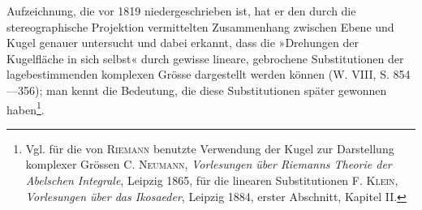 \noindent Aufzeichnung, die vor 1819 niedergeschrieben ist, hat er den durch die stereographische
Projektion vermittelten Zusammenhang zwischen Ebene und Kugel genauer
untersucht und dabei erkannt, dass die »Drehungen der Kugelfläche in sich
selbst« durch gewisse lineare, gebrochene Substitutionen der lagebestimmenden
komplexen Grösse dargestellt werden können (W. VIII, S. 854—356); man
kennt die Bedeutung, die diese Substitutionen später gewonnen haben\footnote{Vgl. für die von \textsc{Riemann} benutzte Verwendung der Kugel zur Darstellung komplexer Grössen C. \textsc{Neumann}, \textit{Vorlesungen über Riemanns Theorie der Abelschen Integrale}, Leipzig 1865, für die linearen Substitutionen F. \textsc{Klein}, \textit{Vorlesungen über das Ikosaeder}, Leipzig 1884, erster Abschnitt, Kapitel II.}.
\clearpage\endgroup
